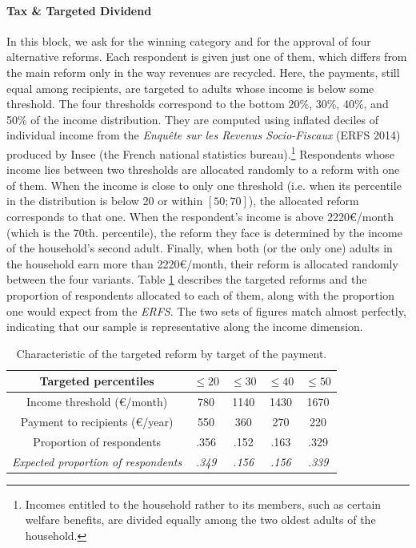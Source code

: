 \documentclass[11pt]{article}
\begin{document}
\paragraph{Tax \& Targeted Dividend}
In this block, we ask for the winning category and for the approval of four alternative reforms. Each respondent is given just one of them, which differs from the main reform only in the way revenues are recycled. Here, the payments, still equal among recipients, are targeted to adults whose income is below some threshold. The four thresholds correspond to the bottom 20\%, 30\%, 40\%, and 50\% of the income distribution. They are computed using inflated deciles of individual income from the \emph{Enquête sur les Revenus Socio-Fiscaux }(ERFS 2014) produced by Insee (the French national statistics bureau).\footnote{Incomes entitled to the household rather to its members, such as certain welfare benefits, are divided equally among the two oldest adults of the household.} Respondents whose income lies between two thresholds are allocated randomly to a reform with one of them. When the income is close to only one threshold (i.e. when its percentile in the distribution is below 20 or within $\left[50;70\right]$), the allocated reform corresponds to that one. When the respondent's income is above 2220\euro{}/month (which is the 70th. percentile), the reform they face is determined by the income of the household's second adult. Finally, when both (or the only one) adults in the household earn more than 2220\euro{}/month, their reform is allocated randomly between the four variants. Table \ref{tab:Compensation-amount-by} describes the targeted reforms and the proportion of respondents allocated to each of them, along with the proportion one would expect from the \emph{ERFS}. The two sets of figures match almost perfectly, indicating that our sample is representative along the income dimension.


\begin{table}[H]
\caption{\label{tab:Compensation-amount-by}Characteristic of the targeted
reform by target of the payment.}
\centering%
\begin{tabular}{ccccc}
\hline 
\hline 
Targeted percentiles & $\leq20$ & $\leq30$ & $\leq40$ & $\leq50$\tabularnewline
\hline 
Income threshold (\euro{}/month) & 780 & 1140 & 1430 & 1670\tabularnewline
Payment to recipients (\euro{}/year) & 550 & 360 & 270 & 220\tabularnewline
Proportion of respondents & .356 & .152 & .163 & .329\tabularnewline
\emph{Expected proportion of respondents} & \emph{.349} & \emph{.156} & \emph{.156} & \emph{.339}\tabularnewline
\hline 
\hline 
\end{tabular}

\end{table}
\end{document}
